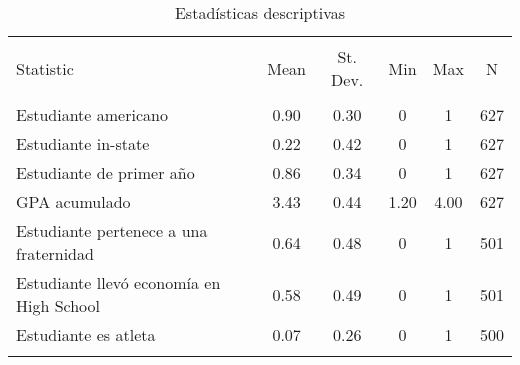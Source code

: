 \begin{table}[!htbp] \centering 
  \caption{Estadísticas descriptivas} 
  \label{} 
\begin{tabular}{@{\extracolsep{5pt}}lccccc} 
\\[-1.8ex]\hline 
\hline \\[-1.8ex] 
Statistic & \multicolumn{1}{c}{Mean} & \multicolumn{1}{c}{St. Dev.} & \multicolumn{1}{c}{Min} & \multicolumn{1}{c}{Max} & \multicolumn{1}{c}{N} \\ 
\hline \\[-1.8ex] 
Estudiante americano & 0.90 & 0.30 & 0 & 1 & 627 \\ 
Estudiante in-state & 0.22 & 0.42 & 0 & 1 & 627 \\ 
Estudiante de primer año & 0.86 & 0.34 & 0 & 1 & 627 \\ 
GPA acumulado & 3.43 & 0.44 & 1.20 & 4.00 & 627 \\ 
Estudiante pertenece a una fraternidad & 0.64 & 0.48 & 0 & 1 & 501 \\ 
Estudiante llevó economía en High School & 0.58 & 0.49 & 0 & 1 & 501 \\ 
Estudiante es atleta & 0.07 & 0.26 & 0 & 1 & 500 \\ 
\hline \\[-1.8ex] 
\end{tabular} 
\end{table} 